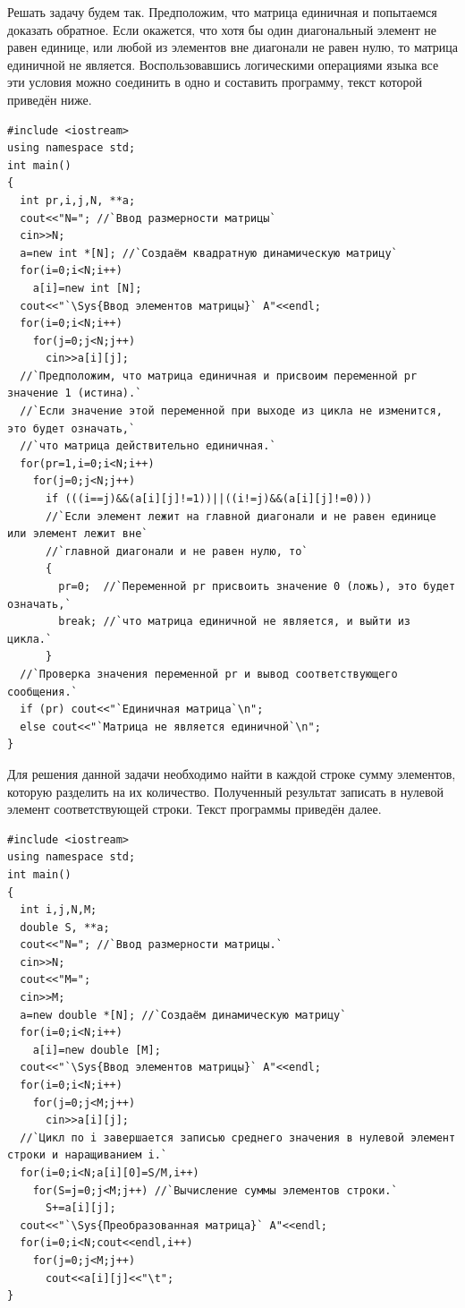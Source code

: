 Решать задачу будем так. Предположим, что матрица единичная и попытаемся доказать обратное. Если окажется, что хотя бы
один диагональный элемент не равен единице, или любой из элементов вне диагонали не равен нулю, то матрица единичной не
является. Воспользовавшись логическими операциями языка  все эти условия можно соединить в одно и составить программу,
текст которой приведён ниже.
\begin{lstlisting}
#include <iostream>
using namespace std;
int main()
{
  int pr,i,j,N, **a; 
  cout<<"N="; //`Ввод размерности матрицы`
  cin>>N;
  a=new int *[N]; //`Создаём квадратную динамическую матрицу`
  for(i=0;i<N;i++)
    a[i]=new int [N];
  cout<<"`\Sys{Ввод элементов матрицы}` A"<<endl;
  for(i=0;i<N;i++)
    for(j=0;j<N;j++)
      cin>>a[i][j];
  //`Предположим, что матрица единичная и присвоим переменной pr значение 1 (истина).` 
  //`Если значение этой переменной при выходе из цикла не изменится, это будет означать,` 
  //`что матрица действительно единичная.`
  for(pr=1,i=0;i<N;i++)
    for(j=0;j<N;j++)
      if (((i==j)&&(a[i][j]!=1))||((i!=j)&&(a[i][j]!=0)))
      //`Если элемент лежит на главной диагонали и не равен единице или элемент лежит вне` 
      //`главной диагонали и не равен нулю, то` 
      {
        pr=0;  //`Переменной pr присвоить значение 0 (ложь), это будет означать,`
        break; //`что матрица единичной не является, и выйти из цикла.`
      }
  //`Проверка значения переменной pr и вывод соответствующего сообщения.` 
  if (pr) cout<<"`Единичная матрица`\n";
  else cout<<"`Матрица не является единичной`\n";
}
\end{lstlisting}


Для решения данной задачи необходимо найти в каждой строке сумму элементов, которую разделить на их количество.
Полученный результат записать в нулевой элемент соответствующей строки. Текст программы приведён далее.
\begin{lstlisting}
#include <iostream>
using namespace std;
int main()
{
  int i,j,N,M;
  double S, **a;
  cout<<"N="; //`Ввод размерности матрицы.`
  cin>>N;
  cout<<"M=";
  cin>>M;
  a=new double *[N]; //`Создаём динамическую матрицу`
  for(i=0;i<N;i++)
    a[i]=new double [M];
  cout<<"`\Sys{Ввод элементов матрицы}` A"<<endl;
  for(i=0;i<N;i++)
    for(j=0;j<M;j++)
      cin>>a[i][j];
  //`Цикл по i завершается записью среднего значения в нулевой элемент строки и наращиванием i.`
  for(i=0;i<N;a[i][0]=S/M,i++)
    for(S=j=0;j<M;j++) //`Вычисление суммы элементов строки.`
      S+=a[i][j];
  cout<<"`\Sys{Преобразованная матрица}` A"<<endl;
  for(i=0;i<N;cout<<endl,i++)
    for(j=0;j<M;j++)
      cout<<a[i][j]<<"\t";
}
\end{lstlisting}

